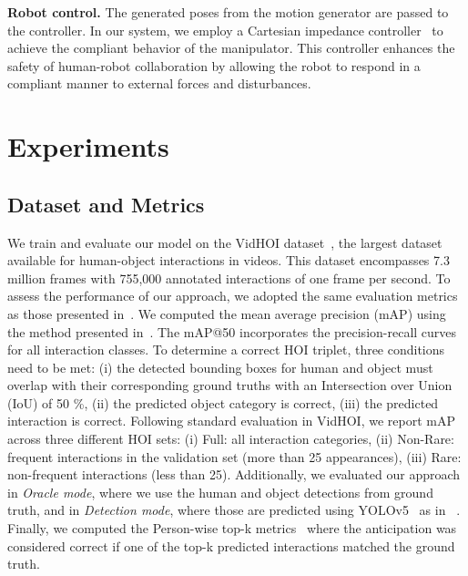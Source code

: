 \documentclass{article}
\begin{document}
\textbf{Robot control.}
The generated poses from the motion generator are passed to the controller. In our system, we employ a Cartesian impedance controller~\citep{4788393, 10.1115/1.3140713} to achieve the compliant behavior of the manipulator. This controller enhances the safety of human-robot collaboration by allowing the robot to respond in a compliant manner to external forces and disturbances.

\section{Experiments} 

\subsection{Dataset and Metrics}
We train and evaluate our model on the VidHOI dataset~\citep{Chiou2021}, the largest dataset available for human-object interactions in videos. This dataset encompasses 7.3 million frames with 755,000 annotated interactions of one frame per second. To assess the performance of our approach, we adopted the same evaluation metrics as those presented in~\citep{NI2023103741}. We computed the mean average precision (mAP) using the method presented in~\citep{tamura_cvpr2021}. The mAP@50 incorporates the precision-recall curves for all interaction classes. To determine a correct HOI triplet, three conditions need to be met: (i) the detected bounding boxes for human and object must overlap with their corresponding ground truths with an Intersection over Union (IoU) of 50 \%, (ii) the predicted object category is correct, (iii) the predicted interaction is correct. Following standard evaluation in VidHOI, we report mAP across three different HOI sets: (i) Full: all interaction categories, (ii) Non-Rare: frequent interactions in the validation set (more than 25 appearances), (iii) Rare: non-frequent interactions (less than 25). Additionally, we evaluated our approach in  \textit{Oracle mode}, where we use the human and object detections from ground truth, and in \textit{Detection mode}, where those are predicted using YOLOv5~\citep{YOLOv5} as in ~\citep{NI2023103741}. Finally, we computed the Person-wise top-k metrics~\citep{NI2023103741} where the anticipation was considered correct if one of the top-k predicted interactions matched the ground truth. 
\end{document}
